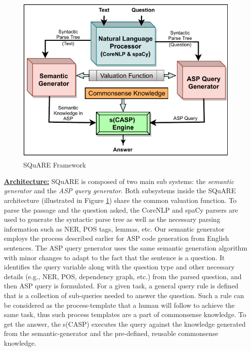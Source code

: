 \documentclass[letterpaper]{article}
\begin{document}
\begin{figure}[h]
    \centering
    \includegraphics[scale = 0.7]{general_framework}
    \caption{ SQuARE Framework }
    \label{fig:genral_framework}
    \end{figure}
\noindent\textbf{\underline{Architecture:}}
SQuARE is composed of two main sub systems: the \textit{semantic generator} and the \textit{ASP query generator}. Both subsystems inside the SQuARE architecture (illustrated in Figure \ref{fig:genral_framework}) share the common valuation function. To parse the passage and the question asked, the CoreNLP and spaCy parsers are used to generate the syntactic parse tree as well as the necessary parsing information such as NER, POS tags, lemmas, etc. Our semantic generator employs the process described earlier for ASP code generation from English sentences. The ASP query generator uses the same semantic generation algorithm with minor changes to adapt to the fact that the sentence is a question. It identifies the query variable along with the question type and other necessary details (e.g., NER, POS, dependency graph, etc.) from the parsed question, and then ASP query is formulated. For a given task, a  general query rule is defined that is a collection of sub-queries needed to answer the question. Such a rule can be considered as the process-template that a human will follow to achieve the same task, thus such process templates are a part of commonsense knowledge. To get the answer, the s(CASP) executes the query against the knowledge generated from the semantic-generator and the pre-defined, reusable commonsense knowledge.
\end{document}
